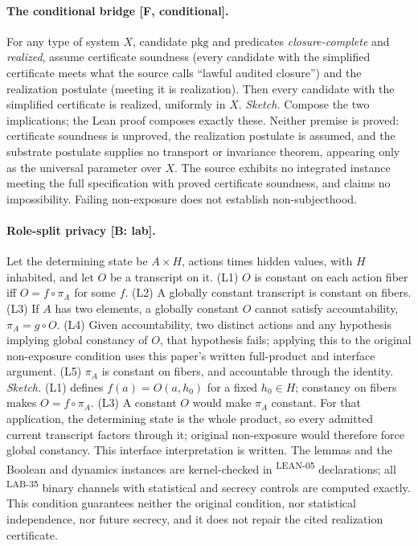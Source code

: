 \documentclass[pdflatex,sn-basic]{sn-jnl}%
\newcommand{\rec}[1]{\ifannotated\textsuperscript{\textcolor{blue!60!black}{\tiny#1}}\fi}
\newcommand{\enquote}[1]{``#1''}
\begin{document}
\begin{appendices}
\paragraph{The conditional bridge [F, conditional].} For any type of system $X$, candidate $\mathrm{pkg}$ and predicates \emph{closure-complete} and \emph{realized}, assume certificate soundness (every candidate with the simplified certificate meets what the source calls \enquote{lawful audited closure}) and the realization postulate (meeting it is realization). Then every candidate with the simplified certificate is realized, uniformly in $X$. \emph{Sketch.} Compose the two implications; the Lean proof composes exactly these. Neither premise is proved: certificate soundness is unproved, the realization postulate is assumed, and the substrate postulate supplies no transport or invariance theorem, appearing only as the universal parameter over $X$. The source exhibits no integrated instance meeting the full specification with proved certificate soundness, and claims no impossibility. Failing non-exposure does not establish non-subjecthood.

\paragraph{Role-split privacy [B: lab].} Let the determining state be $A\times H$, actions times hidden values, with $H$ inhabited, and let $O$ be a transcript on it. (L1) $O$ is constant on each action fiber iff $O=f\circ\pi_A$ for some $f$. (L2) A globally constant transcript is constant on fibers. (L3) If $A$ has two elements, a globally constant $O$ cannot satisfy accountability, $\pi_A=g\circ O$. (L4) Given accountability, two distinct actions and any hypothesis implying global constancy of $O$, that hypothesis fails; applying this to the original non-exposure condition uses this paper's written full-product and interface argument. (L5) $\pi_A$ is constant on fibers, and accountable through the identity. \emph{Sketch.} (L1) defines $f(a)=O(a,h_0)$ for a fixed $h_0\in H$; constancy on fibers makes $O=f\circ\pi_A$. (L3) A constant $O$ would make $\pi_A$ constant. For that application, the determining state is the whole product, so every admitted current transcript factors through it; original non-exposure would therefore force global constancy. This interface interpretation is written. The lemmas and the Boolean and dynamics instances are kernel-checked in \numLeanRolePrivacy\rec{LEAN-05} declarations; all \numCTwoChannels\rec{LAB-35} binary channels with statistical and secrecy controls are computed exactly. This condition guarantees neither the original condition, nor statistical independence, nor future secrecy, and it does not repair the cited realization certificate.


\end{appendices}
\end{document}
